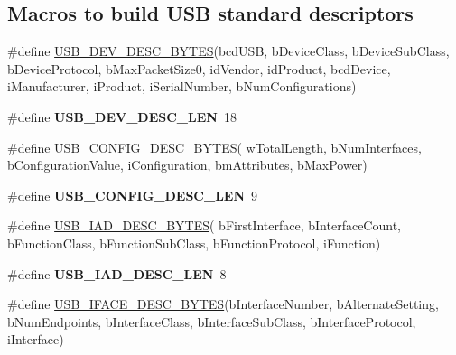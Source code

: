 \subsection*{Macros to build U\+SB standard descriptors}
\begin{DoxyCompactItemize}
\item 
\#define \hyperlink{group__usb__protocol__group_ga3122a6c464e828780450a6ac9fa0a5b1}{U\+S\+B\+\_\+\+D\+E\+V\+\_\+\+D\+E\+S\+C\+\_\+\+B\+Y\+T\+ES}(bcd\+U\+SB,  b\+Device\+Class,  b\+Device\+Sub\+Class,  b\+Device\+Protocol,  b\+Max\+Packet\+Size0,  id\+Vendor,  id\+Product,  bcd\+Device,  i\+Manufacturer,  i\+Product,  i\+Serial\+Number,  b\+Num\+Configurations)
\item 
\mbox{\label{group__usb__protocol__group_ga901cb68250dc2f4c3923a5886e5be313}} 
\#define {\bfseries U\+S\+B\+\_\+\+D\+E\+V\+\_\+\+D\+E\+S\+C\+\_\+\+L\+EN}~18
\item 
\#define \hyperlink{group__usb__protocol__group_ga6aa0ff9bcc7f846c86ccf7f9cd180dee}{U\+S\+B\+\_\+\+C\+O\+N\+F\+I\+G\+\_\+\+D\+E\+S\+C\+\_\+\+B\+Y\+T\+ES}( w\+Total\+Length,  b\+Num\+Interfaces,  b\+Configuration\+Value,  i\+Configuration,  bm\+Attributes,  b\+Max\+Power)
\item 
\mbox{\label{group__usb__protocol__group_gac7260d02275590c624a2cb66a567cd17}} 
\#define {\bfseries U\+S\+B\+\_\+\+C\+O\+N\+F\+I\+G\+\_\+\+D\+E\+S\+C\+\_\+\+L\+EN}~9
\item 
\#define \hyperlink{group__usb__protocol__group_ga80815c81bf0cc49109676aaa0e79691e}{U\+S\+B\+\_\+\+I\+A\+D\+\_\+\+D\+E\+S\+C\+\_\+\+B\+Y\+T\+ES}( b\+First\+Interface,  b\+Interface\+Count,  b\+Function\+Class,  b\+Function\+Sub\+Class,  b\+Function\+Protocol,  i\+Function)
\item 
\mbox{\label{group__usb__protocol__group_gaccc8adfeac5a149d6c900195a8c8ed25}} 
\#define {\bfseries U\+S\+B\+\_\+\+I\+A\+D\+\_\+\+D\+E\+S\+C\+\_\+\+L\+EN}~8
\item 
\#define \hyperlink{group__usb__protocol__group_gabf60119d96399470a7caaac30e8f3df8}{U\+S\+B\+\_\+\+I\+F\+A\+C\+E\+\_\+\+D\+E\+S\+C\+\_\+\+B\+Y\+T\+ES}(b\+Interface\+Number,  b\+Alternate\+Setting,  b\+Num\+Endpoints,  b\+Interface\+Class,  b\+Interface\+Sub\+Class,  b\+Interface\+Protocol,  i\+Interface)
\item 
\mbox{\label{group__usb__protocol__group_ga8d48b4d444be4d49f446a2fbc4e84775}} 

\end{DoxyCompactItemize}
